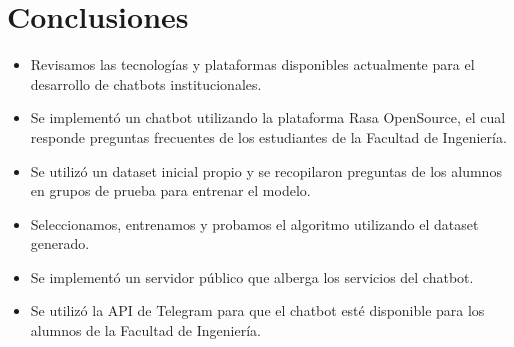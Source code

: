 \section[Conclusiones]{Conclusiones}
\begin{itemize}
	\item Revisamos las tecnologías y plataformas disponibles actualmente para el desarrollo de
	      chatbots institucionales.
	\item Se implementó un chatbot utilizando la plataforma Rasa OpenSource, el cual responde preguntas
	      frecuentes de los estudiantes de la Facultad de Ingeniería.
	\item Se utilizó un dataset inicial propio y se recopilaron preguntas de los alumnos en grupos de
	      prueba para entrenar el modelo.
	\item Seleccionamos, entrenamos y probamos el algoritmo utilizando el dataset generado.
	\item Se implementó un servidor público que alberga los servicios del chatbot.
	\item Se utilizó la API de Telegram para que el chatbot esté disponible para los alumnos de la
	      Facultad de Ingeniería.
\end{itemize}
